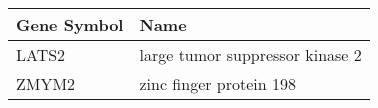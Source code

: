 \begin{tabular}{ll}
\toprule
Gene Symbol &                            Name \\
\midrule
      LATS2 & large tumor suppressor kinase 2 \\
      ZMYM2 &         zinc finger protein 198 \\
\bottomrule
\end{tabular}
